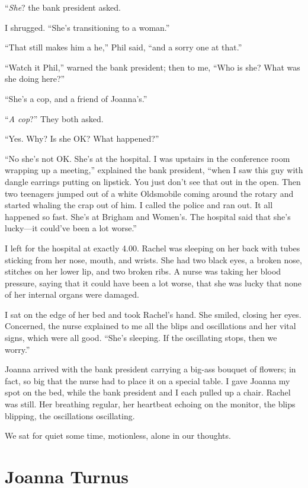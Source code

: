 ``\emph{She}? the bank president asked.

I shrugged. ``She's transitioning to a woman.''

``That still makes him a he,'' Phil said, ``and a sorry one at that.''

``Watch it Phil,'' warned the bank president; then to me, ``Who is she?
What was she doing here?''

``She's a cop, and a friend of Joanna's.''

``\emph{A cop}?'' They both asked.

``Yes. Why? Is she OK? What happened?''

``No she's not OK. She's at the hospital. I was upstairs in the
conference room wrapping up a meeting,'' explained the bank president,
``when I saw this guy with dangle earrings putting on lipstick. You just
don't see that out in the open. Then two teenagers jumped out of a white
Oldsmobile coming around the rotary and started whaling the crap out of
him. I called the police and ran out. It all happened so fast. She's at
Brigham and Women's. The hospital said that she's lucky---it could've
been a lot worse.''

I left for the hospital at exactly 4.00. Rachel was sleeping on her back
with tubes sticking from her nose, mouth, and wrists. She had two black
eyes, a broken nose, stitches on her lower lip, and two broken ribs. A
nurse was taking her blood pressure, saying that it could have been a
lot worse, that she was lucky that none of her internal organs were
damaged.

I sat on the edge of her bed and took Rachel's hand. She smiled, closing
her eyes. Concerned, the nurse explained to me all the blips and
oscillations and her vital signs, which were all good. ``She's sleeping.
If the oscillating stops, then we worry.''

Joanna arrived with the bank president carrying a big-ass bouquet of
flowers; in fact, so big that the nurse had to place it on a special
table. I gave Joanna my spot on the bed, while the bank president and I
each pulled up a chair. Rachel was still. Her breathing regular, her
heartbeat echoing on the monitor, the blips blipping, the oscillations
oscillating.

We sat for quiet some time, motionless, alone in our thoughts.

\chapter{Joanna Turnus}

